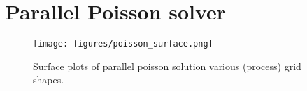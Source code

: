 \section{Parallel Poisson solver}

\begin{figure}[h]
    \centering
    \texttt{[image: figures/poisson\_surface.png]}
    \caption{Surface plots of parallel poisson solution various (process) grid shapes.}
    \label{fig:ppoisson_surface}
\end{figure}
